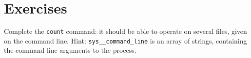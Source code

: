 \section*{Exercises}

\begin{exo}\label{Modules:1}
Complete the \verb"count" command: it should be able to operate on
several files, given on the command line. Hint:
\verb"sys__command_line" is an array of strings, containing the
command-line arguments to the process.
\end{exo}
